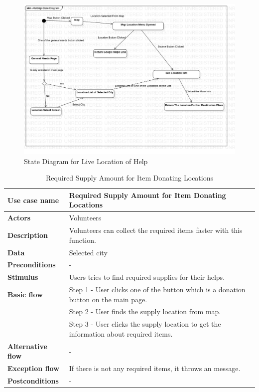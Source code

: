 \begin{figure}[H]
    \includegraphics[scale = 0.45]{assets/StateDiagramSuggestion.jpg}
    \caption[State Diagram for Live Location of Help]{State Diagram for Live Location of Help}
\end{figure}

\begin{center}
    \begin{table}[H]
        \begin{tabular}{| m{3cm}| m{10cm} |}
            \hline
            \textbf{Use case name} & Required Supply Amount for Item Donating Locations\\
            \hline
            \textbf{Actors} & Volunteers\\
            \hline
            \textbf{Description} & Volunteers can collect the required items faster with this function.\\
            \hline
            \textbf{Data} & Selected city\\
            \hline
            \textbf{Preconditions} & - \\
            \hline
            \textbf{Stimulus} & Users tries to find required supplies for their helps.\\
            \hline
            \textbf{Basic flow} & Step 1 - User clicks one of the button which is a donation button on the main page.\\
                                & Step 2 - User finds the supply location from map. \\
                                & Step 3 - User clicks the supply location to get the information about required items. \\
            \hline
            \textbf{Alternative flow} & - \\
            \hline
            \textbf{Exception flow} & If there is not any required items, it throws an message.\\
            \hline
            \textbf{Postconditions} & - \\
            \hline
        \end{tabular}
        \caption[Required Supply Amount for Item Donating Locations]{Required Supply Amount for Item Donating Locations}
    \end{table}
\end{center}

